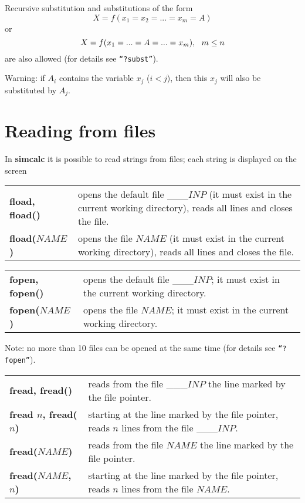 Recursive substitution and substitutions of the form
$$X = f(x_1 = x_2 = ...  = x_m = A)$$
or
$$X = f(x_1 = ... = A = ... = x_m), \mbox{\ \ } m \leq n$$
are also allowed (for details see {\tt ``?subst''}).

Warning: if $A_i$ contains the variable $x_j$ ($i < j$), then this $x_j$ will also
be substituted by $A_j$.



\section{Reading from files}
In {\bf simcalc} it is possible to read strings from files; each string is
displayed on the screen

\leer
\begin{tabular}{p{1.2in}p{3.96in}}
{\bf fload, fload()} &
opens the default file \_\_\_$INP$ (it must exist in the current working directory), 
reads all lines and closes the file.\\

{\bf fload($NAME$)} &
opens the file $NAME$ (it must exist in the current working directory),
reads all lines and closes the file.
\end{tabular}

\leer
\begin{tabular}{p{1.2in}p{3.96in}}
{\bf fopen, fopen()} &
opens the default file \_\_\_$INP$; it must exist in the current working directory.\\

{\bf fopen($NAME$)} &
opens the file $NAME$; it must exist in the current working directory.
\end{tabular}

\leer
Note: no more than 10 files can be opened at the same time (for details see {\tt ``?fopen''}).

\leer
\begin{tabular}{p{1.4in}p{3.96in}}
{\bf fread, fread()} &
reads from the file \_\_\_$INP$ the line marked by the file pointer.\\

{\bf fread $n$, fread($n$)} &
starting at the line marked by the file pointer, reads $n$ lines from the file \_\_\_$INP$.\\


{\bf fread($NAME$)} &
reads from the file $NAME$ the line marked by the file pointer.\\

{\bf fread($NAME$, $n$)} &
starting at the line marked by the file pointer, reads $n$ lines from the file $NAME$.
\end{tabular}

